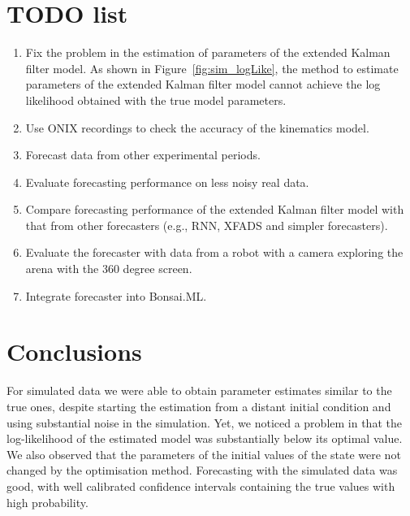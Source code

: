 \documentclass[12pt]{article}
\begin{document}
\section{TODO list}
\label{sec:TODO}

\begin{enumerate}

    \item Fix the problem in the estimation of parameters of the extended
        Kalman filter model. As shown in Figure~\ref{fig:sim_logLike}, the
        method to estimate parameters of the extended Kalman filter model
        cannot achieve the log likelihood obtained with the true model
        parameters.

    \item Use ONIX recordings to check the accuracy of the kinematics model.

    \item Forecast data from other experimental periods.

    \item Evaluate forecasting performance on less noisy real data.

    \item Compare forecasting performance of the extended Kalman filter model
        with that from other forecasters (e.g., RNN, XFADS and simpler
        forecasters).

    \item Evaluate the forecaster with data from a robot with a camera
        exploring the arena with the 360 degree screen.

    \item Integrate forecaster into Bonsai.ML.

\end{enumerate}

\section{Conclusions}

For simulated data we were able to obtain parameter estimates similar to the
true ones, despite starting the estimation from a distant initial condition and
using substantial noise in the simulation.
%
Yet, we noticed a problem in that the log-likelihood of the estimated model was
substantially below its optimal value. We also observed that the parameters of
the initial values of the state were not changed by the optimisation method.
%
Forecasting with the simulated data was good, with well calibrated confidence
intervals containing the true values with high probability.
\end{document}
